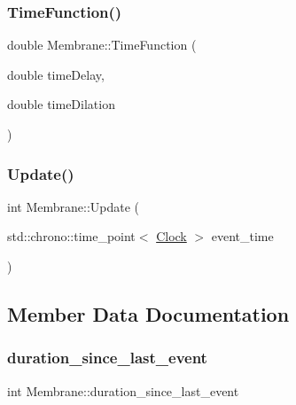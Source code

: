 \mbox{\label{classMembrane_a8c3593b0747495c412bf2d99b7b10104}} 
\subsubsection{\texorpdfstring{Time\+Function()}{TimeFunction()}}
{\footnotesize\ttfamily double Membrane\+::\+Time\+Function (\begin{DoxyParamCaption}\item[{double}]{time\+Delay,  }\item[{double}]{time\+Dilation }\end{DoxyParamCaption})\hspace{0.3cm}{\ttfamily [inline]}}

\mbox{\label{classMembrane_a4af9710ea7f0bc6f1b6b6b6462612d51}} 
\subsubsection{\texorpdfstring{Update()}{Update()}}
{\footnotesize\ttfamily int Membrane\+::\+Update (\begin{DoxyParamCaption}\item[{std\+::chrono\+::time\+\_\+point$<$ \mbox{\hyperlink{universe_8h_a0ef8d951d1ca5ab3cfaf7ab4c7a6fd80}{Clock}} $>$}]{event\+\_\+time }\end{DoxyParamCaption})}



\subsection{Member Data Documentation}
\mbox{\label{classMembrane_a7e2df85f4d5a0aff0b02636e35a4aeaf}} 
\subsubsection{\texorpdfstring{duration\+\_\+since\+\_\+last\+\_\+event}{duration\_since\_last\_event}}
{\footnotesize\ttfamily int Membrane\+::duration\+\_\+since\+\_\+last\+\_\+event\hspace{0.3cm}{\ttfamily [private]}}

